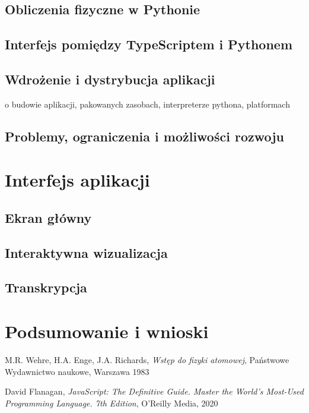 \documentclass{SGGW-thesis}
\begin{document}
	\section{Obliczenia fizyczne w Pythonie}
	\section{Interfejs pomiędzy TypeScriptem i Pythonem}
	\section{Wdrożenie i dystrybucja aplikacji}
	o budowie aplikacji, pakowanych zasobach, interpreterze pythona, platformach
	\section{Problemy, ograniczenia i możliwości rozwoju}

\chapter{Interfejs aplikacji}
	\section{Ekran główny}
	\section{Interaktywna wizualizacja}
	\section{Transkrypcja}
	
\chapter{Podsumowanie i wnioski}


\begin{thebibliography}{9}
	M.R. Wehre, H.A. Enge, J.A. Richards,
	\textit{Wstęp do fizyki atomowej}, 
	Państwowe Wydawnictwo naukowe, Warszawa 1983
	
	David Flanagan, 
	\textit{JavaScript: The Definitive Guide. Master the World's Most-Used Programming Language. 7th Edition}, 
	O'Reilly Media, 2020
	
	
\end{thebibliography}

\beforelastpage
\end{document}
